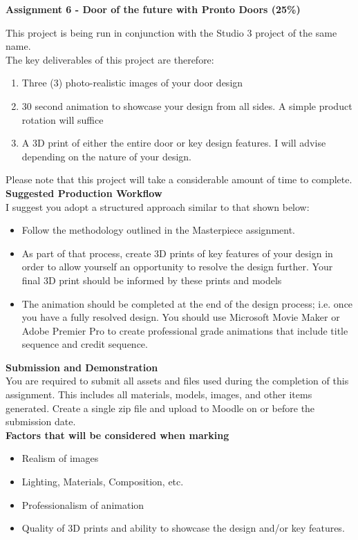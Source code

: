 
	
\begin{flushleft}
\Large\textbf{Assignment 6 - Door of the future with Pronto Doors (25\%)}\\
\end{flushleft}

This project is being run in conjunction with the Studio 3 project of the same name.\\

The key deliverables of this project are therefore:

\begin{enumerate}
	\item Three (3) photo-realistic images of your door design 
	\item 30 second animation to showcase your design from all sides. A simple product rotation will suffice
	\item A 3D print of either the entire door or key design features.  I will advise depending on the nature of your design.
\end{enumerate}

Please note that this project will take a considerable amount of time to complete.\\

\textbf{Suggested Production Workflow}\\
I suggest you adopt a structured approach similar to that shown below:

\begin{itemize}
	\item Follow the methodology outlined in the Masterpiece assignment.
	\item As part of that process, create 3D prints of key features of your design in order to allow yourself an opportunity to resolve the design further.  Your final 3D print should be informed by these prints and models
	\item The animation should be completed at the end of the design process; i.e. once you have a fully resolved design.  You should use Microsoft Movie Maker or Adobe Premier Pro to create professional grade animations that include title sequence and credit sequence.
\end{itemize}

\textbf{Submission and Demonstration}\\

You are required to submit all assets and files used during the completion of this assignment.  This includes all materials, models, images, and other items generated.  Create a single zip file and upload to Moodle on or before the submission date.\\

\textbf{Factors that will be considered when marking}\\
\begin{itemize}
	\item Realism of images
	\item Lighting, Materials, Composition, etc.
	\item Professionalism of animation
	\item Quality of 3D prints and ability to showcase the design and/or key features.
\end{itemize}


